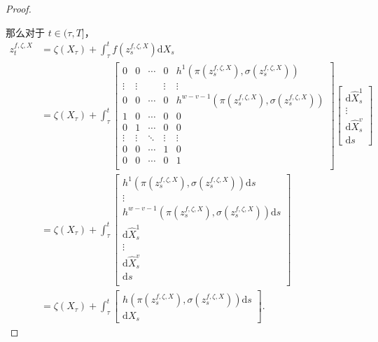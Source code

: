 \documentclass{ctexart}
\theoremstyle{plain}
\theoremstyle{definition}
\begin{document}
\begin{proof}
\begin{center}
\end{center}

	那么对于 $t \in (\tau, T]$，
\begin{align*}
	z^{f, \zeta, X}_t &= \zeta(X_\tau) + \int_\tau^t f(z^{f, \zeta, X}_s) \mathrm{d}X_s\\
	&=\zeta(X_\tau) + \int_\tau^t
\begin{bmatrix}
	0 & 0 & \cdots & 0 & h^1(\pi(z^{f, \zeta, X}_s), \sigma(z^{f, \zeta, X}_s))\\
	\vdots & \vdots & & \vdots & \vdots\\
	0 & 0 & \cdots & 0 & h^{w-v-1}(\pi(z^{f, \zeta, X}_s), \sigma(z^{f, \zeta, X}_s))\\
	1 & 0 & \cdots & 0 & 0\\
	0 & 1 & \cdots & 0 & 0\\
	\vdots & \vdots & \ddots & \vdots & \vdots\\
	0 & 0 & \cdots & 1 & 0\\
	0 & 0 & \cdots & 0 & 1\\
\end{bmatrix}
\begin{bmatrix}
	\mathrm{d}\widehat{X}^1_s\\
	\vdots\\
	\mathrm{d}\widehat{X}^v_s\\
	\mathrm{d}s
\end{bmatrix}\\
	&= \zeta(X_\tau) + \int_\tau^t
\begin{bmatrix}
	h^1(\pi(z^{f, \zeta, X}_s), \sigma(z^{f, \zeta, X}_s)) \mathrm{d}s\\
	\vdots\\
	h^{w-v-1}(\pi(z^{f, \zeta, X}_s), \sigma(z^{f, \zeta, X}_s)) \mathrm{d}s\\
	\mathrm{d}\widehat{X}^1_s\\
	\vdots\\
	\mathrm{d}\widehat{X}^v_s\\
	\mathrm{d}s\\
\end{bmatrix}\\
	&= \zeta(X_\tau) + \int_\tau^t
\begin{bmatrix}
	h(\pi(z^{f, \zeta, X}_s), \sigma(z^{f, \zeta, X}_s)) \mathrm{d}s\\
	\mathrm{d}X_s
\end{bmatrix}.
\end{align*}
	

\end{proof}
\end{document}
